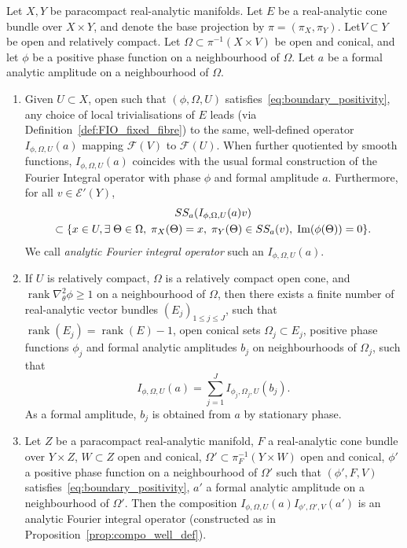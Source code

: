 \documentclass[AHL,Unicode,longabstracts,published]{cedram}
\DeclareMathOperator{\im}{Im}
\DeclareMathOperator{\rank}{rank}
\newcommand{\clE}{\mathcal{E}}
\newcommand{\clF}{\mathcal{F}}
\newcommand\1{\mathds{1}}
\let\oldexists\exists
\renewcommand*{\exists}{\mathrel{\oldexists}}
\let\originalleft\left
\let\originalright\right
\renewcommand{\left}{\mathopen{}\mathclose\bgroup\originalleft}
\renewcommand{\right}{\aftergroup\egroup\originalright}
\begin{document}
\begin{theo}\label{prop:FIOs}
Let $X,Y$ be paracompact real-analytic manifolds. Let $E$ be a real-analytic cone bundle over $X\times Y$, and denote the base projection by $\pi=(\pi_X,\pi_Y)$. Let$V\subset Y$ be open and relatively compact. Let $\Omega\subset \pi^{-1}(X\times V)$ be open and conical, and let $\phi$ be a positive phase function on a neighbourhood of $\Omega$. Let $a$ be a formal analytic amplitude on a neighbourhood of $\Omega$.
\begin{enumerate}
\item Given $U\subset X$, open such that $(\phi,\Omega,U)$ satisfies~\eqref{eq:boundary_positivity}, any choice of local trivialisations of $E$ leads (via Definition~\ref{def:FIO_fixed_fibre}) to the same, well-defined operator $I_{\phi,\Omega,U}(a)$ mapping $\clF(V)$ to $\clF(U)$. When further quotiented by smooth functions, $I_{\phi,\Omega,U}(a)$ coincides with the usual formal construction of the Fourier {Integral} operator with phase $\phi$ and formal amplitude $a$. Furthermore, for all $v\in
\clE'(Y)$,
\begin{multline*}
SS_a(I_{\phi,\Omega,U}(a)v)\\
\subset \left\{x\in U, \exists \Theta \in \Omega,\;
\pi_X (\Theta)=x, \;\pi_Y(\Theta)\in SS_a(v),\; \im(\phi(\Theta))=0\right\}.
\end{multline*}
We call \emph{analytic Fourier integral operator} such an $I_{\phi,\Omega,U}(a)$.

\item If $U$ is relatively compact, $\Omega$ is a relatively compact open cone, and\linebreak ${\rank \nabla^2_{\theta}\phi\geq 1}$ on a neighbourhood of $\Omega$, then there exists a finite number of real-analytic vector bundles $(E_j)_{1\leq j\leq J}$, such that $\rank(E_j)=\rank(E)-1$, open conical sets $\Omega_j\subset E_j$, positive phase functions $\phi_j$ and formal analytic amplitudes $b_j$ on neighbourhoods of $\Omega_j$, such that
\[
I_{\phi,\Omega,U}(a)=\sum_{j=1}^JI_{\phi_j,\Omega_j,U}(b_j).
\]
As a formal amplitude, $b_j$ is obtained from $a$ by stationary phase.

\item Let $Z$ be a paracompact real-analytic manifold, $F$ a real-analytic cone bundle over $Y\times Z$, $W\subset Z$ open and conical, $\Omega'\subset \pi_F^{-1}(Y\times W)$ open and conical, $\phi'$ a positive phase function on a neighbourhood of $\Omega'$ such that $(\phi',F,V)$ satisfies~\eqref{eq:boundary_positivity}, $a'$ a formal analytic amplitude on a neighbourhood of $\Omega'$. Then the composition $I_{\phi,\Omega,U}(a)I_{\phi',\Omega',V}(a')$ is an analytic Fourier integral operator (constructed as in Proposition~\ref{prop:compo_well_def}).
\end{enumerate}
\end{theo}
\end{document}

